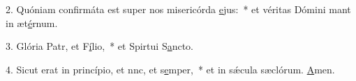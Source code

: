 2. Quóniam confirmáta est super nos misericórda \uline{e}jus:~* et véritas Dómini mant in æt\uline{é}rnum.\par 
3. Glória Patr, et F\uline{í}lio,~* et Spirtui S\uline{a}ncto.\par 
4. Sicut erat in princípio, et nnc, et s\uline{e}mper,~* et in sǽcula sæclórum. \uline{A}men.\par 
